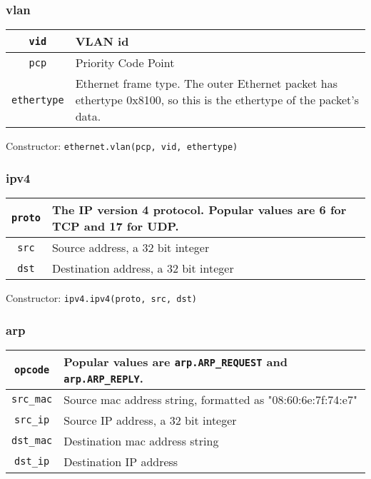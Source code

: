 \subsubsection{vlan}

\bigskip
\begin{tabularx}{6in}{|c|X|}
\hline\hline
\texttt{vid} & VLAN id 
\\ \hline
\texttt{pcp} & Priority Code Point 
\\ \hline
\texttt{ethertype} & Ethernet frame type.  
The outer Ethernet packet has ethertype 0x8100, so this is the ethertype of the packet's data.
\\ \hline\hline
\end{tabularx}

\bigskip
Constructor: \texttt{ethernet.vlan(pcp, vid, ethertype)}

\subsubsection{ipv4}

\bigskip
\begin{tabularx}{6in}{|c|X|}
\hline\hline
\texttt{proto} & The IP version 4 protocol.  
Popular values are  6 for TCP and 17 for UDP.
\\ \hline
\texttt{src} & Source address, a 32 bit integer 
\\ \hline
\texttt{dst} & Destination address, a 32 bit integer
\\ \hline\hline
\end{tabularx}

\bigskip
Constructor: \texttt{ipv4.ipv4(proto, src, dst)}

\subsubsection{arp}

\bigskip
\begin{tabularx}{6in}{|c|X|}
\hline\hline
\texttt{opcode} & Popular values are \texttt{arp.ARP\_REQUEST} and \texttt{arp.ARP\_REPLY}.  
\\ \hline
\texttt{src\_mac} & Source mac address string, formatted as "08:60:6e:7f:74:e7"  
\\ \hline
\texttt{src\_ip} & Source IP address, a 32 bit integer  
\\ \hline
\texttt{dst\_mac} & Destination mac address string  
\\ \hline
\texttt{dst\_ip} & Destination IP address  
\\ \hline\hline
\end{tabularx}

